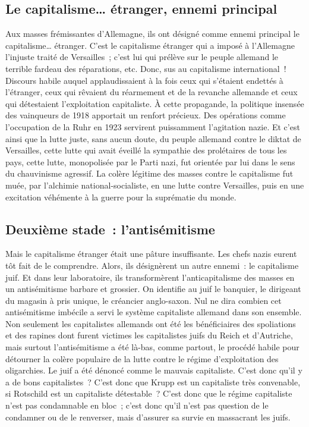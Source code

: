 \documentclass[french,twoside]{book} %
\begin{document}
\subsection[Le capitalisme… étranger, ennemi principal]{Le capitalisme… étranger, ennemi principal}
\noindent Aux masses frémissantes d’Allemagne, ils ont désigné comme ennemi principal le capitalisme… étranger. C’est le capitalisme étranger qui a imposé à l’Allemagne l’injuste traité de Versailles ; c’est lui qui prélève sur le peuple allemand le terrible fardeau des réparations, etc. Donc, sus au capitalisme international ! Discours habile auquel applaudissaient à la fois ceux qui s’étaient endettés à l’étranger, ceux qui rêvaient du réarmement et de la revanche allemande et ceux qui détestaient l’exploitation capitaliste. À cette propagande, la politique insensée des vainqueurs de 1918 apportait un renfort précieux. Des opérations comme l’occupation de la Ruhr en 1923 servirent puissamment l’agitation nazie. Et c’est ainsi que la lutte juste, sans aucun doute, du peuple allemand contre le diktat de Versailles, cette lutte qui avait éveillé la sympathie des prolétaires de tous les pays, cette lutte, monopolisée par le Parti nazi, fut orientée par lui dans le sens du chauvinisme agressif. La colère légitime des masses contre le capitalisme fut muée, par l’alchimie national-socialiste, en une lutte contre Versailles, puis en une excitation véhémente à la guerre pour la suprématie du monde.
\subsection[Deuxième stade : l’antisémitisme]{Deuxième stade : l’antisémitisme}
\noindent Mais le capitalisme étranger était une pâture insuffisante. Les chefs nazis eurent tôt fait de le comprendre. Alors, ils désignèrent un autre ennemi : le capitalisme juif. Et dans leur laboratoire, ils transformèrent l’anticapitalisme des masses en un antisémitisme barbare et grossier. On identifie au juif le banquier, le dirigeant du magasin à pris unique, le créancier anglo-saxon. Nul ne dira combien cet antisémitisme imbécile a servi le système capitaliste allemand dans son ensemble. Non seulement les capitalistes allemands ont été les bénéficiaires des spoliations et des rapines dont furent victimes les capitalistes juifs du Reich et d’Autriche, mais surtout l’antisémitisme a été là-bas, comme partout, le procédé habile pour détourner la colère populaire de la lutte contre le régime d’exploitation des oligarchies. Le juif a été dénoncé comme le mauvais capitaliste. C’est donc qu’il y a de bons capitalistes ? C’est donc que Krupp est un capitaliste très convenable, si Rotschild est un capitaliste détestable ? C’est donc que le régime capitaliste n’est pas condamnable en bloc ; c’est donc qu’il n’est pas question de le condamner ou de le renverser, mais d’assurer sa survie en massacrant les juifs.
\end{document}
